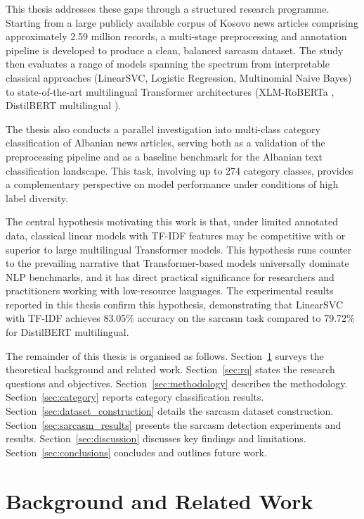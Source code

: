 \documentclass[12pt,a4paper]{article}
\begin{document}
This thesis addresses these gaps through a structured research programme. Starting from a large publicly available corpus of Kosovo news articles \citep{gentrexha2023kosovo} comprising approximately 2.59 million records, a multi-stage preprocessing and annotation pipeline is developed to produce a clean, balanced sarcasm dataset. The study then evaluates a range of models spanning the spectrum from interpretable classical approaches (LinearSVC, Logistic Regression, Multinomial Naive Bayes) to state-of-the-art multilingual Transformer architectures (XLM-RoBERTa \citep{conneau2020unsupervised}, DistilBERT multilingual \citep{sanh2019distilbert}).

The thesis also conducts a parallel investigation into multi-class category classification of Albanian news articles, serving both as a validation of the preprocessing pipeline and as a baseline benchmark for the Albanian text classification landscape. This task, involving up to 274 category classes, provides a complementary perspective on model performance under conditions of high label diversity.

The central hypothesis motivating this work is that, under limited annotated data, classical linear models with TF-IDF features may be competitive with or superior to large multilingual Transformer models. This hypothesis runs counter to the prevailing narrative that Transformer-based models universally dominate NLP benchmarks, and it has direct practical significance for researchers and practitioners working with low-resource languages. The experimental results reported in this thesis confirm this hypothesis, demonstrating that LinearSVC with TF-IDF achieves 83.05\% accuracy on the sarcasm task compared to 79.72\% for DistilBERT multilingual.

The remainder of this thesis is organised as follows. Section~\ref{sec:background} surveys the theoretical background and related work. Section~\ref{sec:rq} states the research questions and objectives. Section~\ref{sec:methodology} describes the methodology. Section~\ref{sec:category} reports category classification results. Section~\ref{sec:dataset_construction} details the sarcasm dataset construction. Section~\ref{sec:sarcasm_results} presents the sarcasm detection experiments and results. Section~\ref{sec:discussion} discusses key findings and limitations. Section~\ref{sec:conclusions} concludes and outlines future work.

\newpage
\section{Background and Related Work}
\label{sec:background}
\end{document}
